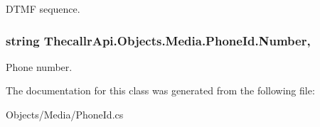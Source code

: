 D\+T\+M\+F sequence. 

\hypertarget{class_thecallr_api_1_1_objects_1_1_media_1_1_phone_id_a34b68bec0423786e356ee0f1d0db1630}{
\subsubsection[{Number}]{\setlength{\rightskip}{0pt plus 5cm}string Thecallr\+Api.\+Objects.\+Media.\+Phone\+Id.\+Number\hspace{0.3cm}{\ttfamily [get]}, {\ttfamily [set]}}}\label{class_thecallr_api_1_1_objects_1_1_media_1_1_phone_id_a34b68bec0423786e356ee0f1d0db1630}


Phone number. 



The documentation for this class was generated from the following file\+:\begin{DoxyCompactItemize}
\item 
Objects/\+Media/Phone\+Id.\+cs\end{DoxyCompactItemize}
